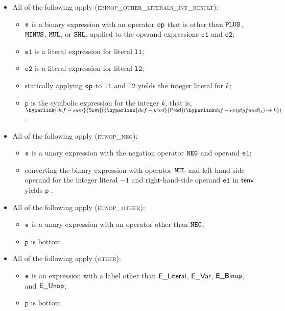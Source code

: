 \documentclass{book}
\newcommand\Prod[0]{\hyperlink{def-prod}{\textsf{Prod}}}
\newcommand\Sum[0]{\hyperlink{def-sum}{\textsf{Sum}}}
\newcommand\vp[0]{\texttt{p}}
\newcommand\veone[0]{\texttt{e1}}
\newcommand\vetwo[0]{\texttt{e2}}
\newcommand\vlone[0]{\texttt{l1}}
\newcommand\vltwo[0]{\texttt{l2}}
\begin{document}
\begin{itemize}
  \item All of the following apply (\textsc{ebinop\_other\_literals\_int\_result}):
  \begin{itemize}
    \item $\texttt{e}$ is a binary expression with an operator $\texttt{op}$ that is other than $\texttt{PLUS}$, $\texttt{MINUS}$, $\texttt{MUL}$, or $\texttt{SHL}$,
          applied to the operand expressions $\veone$ and $\vetwo$;
    \item $\veone$ is a literal expression for literal $\vlone$;
    \item $\vetwo$ is a literal expression for literal $\vltwo$;
    \item statically applying $\texttt{op}$ to $\vlone$ and $\vltwo$ yields the integer literal for $k$;
    \item $\vp$ is the symbolic expression for the integer $k$, that is, $\Sum( \{ \Prod(\emptyfunc)\mapsto k \} )$.
  \end{itemize}

  \item All of the following apply (\textsc{eunop\_neg}):
  \begin{itemize}
    \item $\texttt{e}$ is a unary expression with the negation operator $\texttt{NEG}$ and operand $\veone$;
    \item converting the binary expression with operator $\texttt{MUL}$ and left-hand-side operand for the integer literal $-1$ and
    right-hand-side operand $\veone$ in $\textsf{tenv}$ yields $\vp$ \ProseOrTypeErrorOrBot.
  \end{itemize}

  \item All of the following apply (\textsc{eunop\_other}):
  \begin{itemize}
    \item $\texttt{e}$ is a unary expression with an operator other than $\texttt{NEG}$;
    \item $\vp$ is bottom
  \end{itemize}

  \item All of the following apply (\textsc{other}):
  \begin{itemize}
    \item $\texttt{e}$ is an expression with a label other than $\textsf{E\_Literal}$, $\textsf{E\_Var}$, $\textsf{E\_Binop}$, and $\textsf{E\_Unop}$;
    \item $\vp$ is bottom
  \end{itemize}
\end{itemize}
\end{document}
